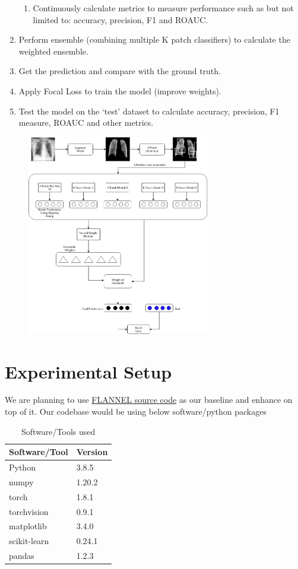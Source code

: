 \documentclass{sigkddExp}
\begin{document}
\begin{enumerate}
\begin{enumerate}
              \item Continuously calculate metrics to measure performance such as but
                    not limited to: accuracy, precision, F1 and ROAUC.
          \end{enumerate}
    \item Perform ensemble (combining multiple K patch classifiers) to calculate the weighted ensemble.
    \item Get the prediction and compare with the ground truth.
    \item Apply Focal Loss to train the model (improve weights).
    \item Test the model on the ‘test’ dataset to calculate accuracy, precision, F1 measure, ROAUC and other metrics.
\end{enumerate}

\begin{figure}[h]
    \includegraphics[width=8cm]{../doc/images/FLANNEL-IMPROVED.png}
\end{figure}


\section{Experimental Setup}

We are planning to use \href{https://github.com/qxiaobu/FLANNEL} {FLANNEL source
    code}  as our baseline and enhance on top of it. Our codebase would be
using below software/python packages
\begin{table}[H]
    \centering
    \caption{Software/Tools used}
    \begin{tabular}{|l|l|} \hline
        Software/Tool & Version \\ \hline
        Python        & 3.8.5   \\ \hline
        numpy         & 1.20.2  \\ \hline
        torch         & 1.8.1   \\ \hline
        torchvision   & 0.9.1   \\ \hline
        matplotlib    & 3.4.0   \\ \hline
        scikit-learn  & 0.24.1  \\ \hline
        pandas        & 1.2.3   \\
        \hline\end{tabular}
\end{table}
\end{document}
